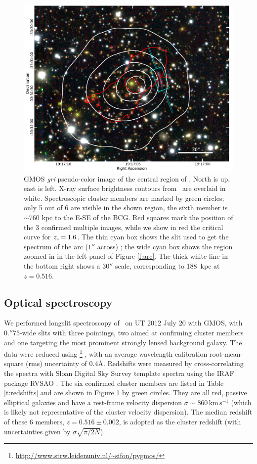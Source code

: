 \begin{figure}
 \centerline{\includegraphics[width=\textwidth]{chapter2/opticalimg-zoom.pdf}}
\caption{GMOS {\it gri} pseudo-color image of the central region of \plck. North is up, east is
left. X-ray surface brightness contours from \xmm\ are overlaid in white. Spectroscopic cluster
members are marked by green circles; only 5 out of 6 are visible in the shown region, the sixth
member is $\sim760$ kpc to the E-SE of the BCG. Red squares mark the position of the 3 confirmed 
multiple images, while we show in red the critical curve for $z_{\rm s}=1.6$. The thin cyan box shows the 
slit used to get the spectrum of the arc ($1''$ across) ; the wide cyan box shows the region
zoomed-in in the left panel of Figure \ref{f:arc}. The thick white line in the bottom right shows a 
$30''$ scale, corresponding to 188~kpc at $z=0.516$.}
\label{f:gri}
\end{figure}

\subsection{Optical spectroscopy}\label{s:spec}

We performed longslit spectroscopy of \plck\ on UT 2012 July 20 with GMOS, with $0.\!''75$-wide
slits with three pointings, two aimed at confirming cluster members and one targeting the most
prominent strongly lensed background galaxy. The data were reduced using
\pygmos\footnote{\url{http://www.strw.leidenuniv.nl/\~sifon/pygmos/}} \citep{sifon13}, with an
average wavelength calibration root-mean-square (rms) uncertainty of 0.4\AA. Redshifts were measured
by cross-correlating the spectra with Sloan Digital Sky Survey \citep{sdss7} 
template spectra using
the IRAF package RVSAO \citep{rvsao}. The six confirmed cluster members are listed in Table
\ref{t:redshifts} and are shown in Figure \ref{f:gri} by green circles. They are all red, passive
elliptical galaxies and have a rest-frame velocity dispersion $\sigma\sim860\,\mathrm{km\,s^{-1}}$
(which is likely not representative of the cluster velocity dispersion). The median redshift of
these 6 members, $z=0.516\pm0.002$, is adopted as the cluster redshift (with uncertainties given by
$\sigma\sqrt{\pi/2N}$).

